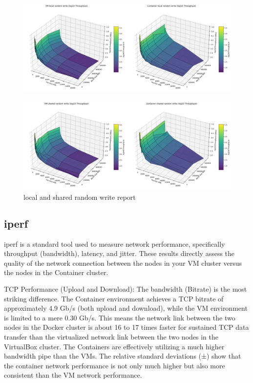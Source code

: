 \begin{figure}[H]
    \centering
    \includegraphics[width=\linewidth]{assets/VM local random write_Container local random write_log_surfaces.png}
        \end{figure}
\begin{figure}[H]
    \centering
    \includegraphics[width=\linewidth]{assets/VM shared random write_Container shared random write_log_surfaces.png}
    \caption{local and shared random write report}
    \label{fig:random write local and shared}
\end{figure}

\subsection{iperf}

iperf is a standard tool used to measure network performance, specifically throughput (bandwidth), latency, and jitter. These results directly assess the quality of the network connection between the nodes in your VM cluster versus the nodes in the Container cluster.

TCP Performance (Upload and Download): 
The bandwidth (Bitrate) is the most striking difference. The Container environment achieves a TCP bitrate of approximately 4.9 Gb/s (both upload and download), while the VM environment is limited to a mere 0.30 Gb/s. This means the network link between the two nodes in the Docker cluster is about 16 to 17 times faster for sustained TCP data transfer than the virtualized network link between the two nodes in the VirtualBox cluster. The Containers are effectively utilizing a much higher bandwidth pipe than the VMs. The relative standard deviations (±) show that the container network performance is not only much higher but also more consistent than the VM network performance.

